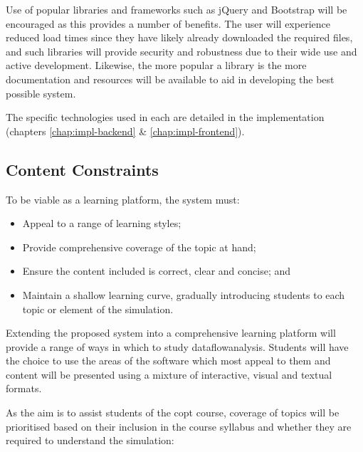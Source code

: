 \documentclass[bsc,twoside,singlespacing,parskip,logo,notimes,normalheadings]{infthesis}
\begin{document}
        Use of popular libraries and frameworks such as jQuery and
        Bootstrap will be encouraged as this provides a number of
        benefits. The user will experience reduced load times since
        they have likely already downloaded the required files, and
        such libraries will provide security and robustness due to
        their wide use and active development. Likewise, the more
        popular a library is the more documentation and resources will
        be available to aid in developing the best possible system.
        
        The specific technologies used in each are detailed in the
        implementation (chapters \ref{chap:impl-backend} \&
        \ref{chap:impl-frontend}).

        
        \subsection{Content Constraints}\label{sec:design-content}
        To be viable as a learning platform, the system must:
        
        \begin{itemize}
        \item Appeal to a range of learning styles;
        \item Provide comprehensive coverage of the topic at hand;
        \item Ensure the content included is correct, clear and
          concise; and
        \item Maintain a shallow learning curve, gradually introducing
          students to each topic or element of the simulation.
        \end{itemize}

        Extending the proposed system into a comprehensive learning
        platform will provide a range of ways in which to study
        \gls{dataflowanalysis}. Students will have the choice to use
        the areas of the software which most appeal to them and
        content will be presented using a mixture of interactive,
        visual and textual formats.

        As the aim is to assist students of the \gls{copt} course,
        coverage of topics will be prioritised based on their
        inclusion in the course syllabus and whether they are required
        to understand the simulation:
\end{document}

